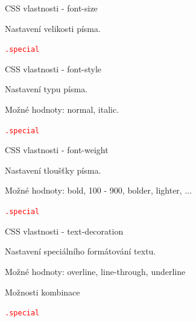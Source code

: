 \documentclass[aspectratio=1610]{beamer}
\begin{document}
\begin{frame}{CSS vlastnosti - font-size}
    \begin{cardTiny}
        Nastavení velikosti písma.

        \begin{alltt}
            \textcolor{red}{.special} \string{\\
                \textcolor{blue}{font-size}: \textcolor{orange}{40px};\\
            \string}
        \end{alltt}
    \end{cardTiny}
\end{frame}

\begin{frame}{CSS vlastnosti - font-style}
    \begin{cardTiny}
        Nastavení typu písma.

        Možné hodnoty: normal, italic.

        \begin{alltt}
            \textcolor{red}{.special} \string{\\
                \textcolor{blue}{font-style}: \textcolor{orange}{italic};\\
            \string}
        \end{alltt}
    \end{cardTiny}
\end{frame}

\begin{frame}{CSS vlastnosti - font-weight}
    \begin{cardTiny}
        Nastavení tloušťky písma.

        Možné hodnoty: bold, 100 - 900, bolder, lighter, ...

        \begin{alltt}
            \textcolor{red}{.special} \string{\\
                \textcolor{blue}{font-weight}: \textcolor{orange}{bold};\\
            \string}
        \end{alltt}
    \end{cardTiny}
\end{frame}

\begin{frame}{CSS vlastnosti - text-decoration}
    \begin{cardTiny}
        Nastavení speciálního formátování textu.

        Možné hodnoty: overline, line-through, underline

        Možnosti kombinace

        \begin{alltt}
            \textcolor{red}{.special} \string{\\
                \textcolor{blue}{text-decoration}: \textcolor{orange}{overline underline};\\
            \string}
        \end{alltt}
    \end{cardTiny}
\end{frame}
\end{document}
